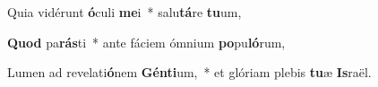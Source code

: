 \item Quia vidérunt \textbf{ó}culi \textbf{me}i~* salu\textbf{tá}re \textbf{tu}um,
\item \textbf{Quod} pa\textbf{rás}ti~* ante fáciem ómnium \textbf{po}pu\textbf{ló}rum,
\item Lumen ad revelati\textbf{ó}nem \textbf{Gén}\textbf{ti}um,~* et glóriam plebis \textbf{tu}æ \textbf{Is}raël.
